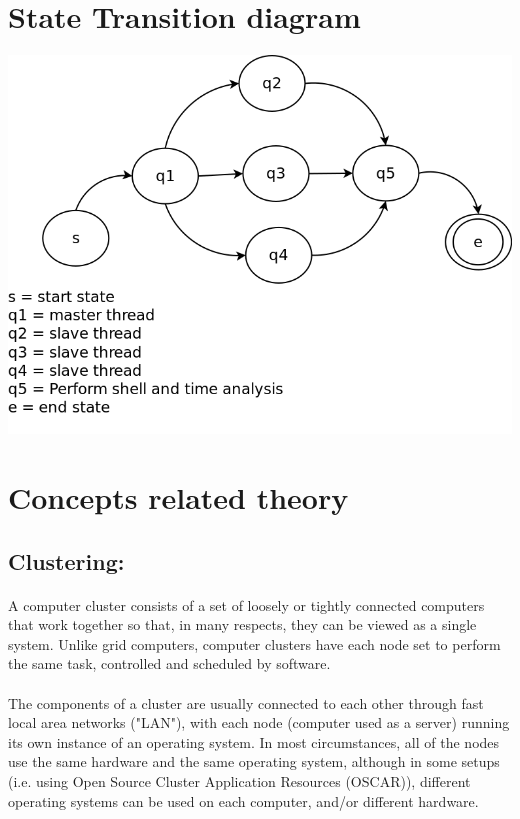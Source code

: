 \documentclass[10pt,a4paper]{article}
\begin{document}
\section{State Transition diagram}
\includegraphics[scale=0.30]{stdg.png}

\section{Concepts related theory}
\subsection{Clustering:} 
\paragraph{} A computer cluster consists of a set of loosely or tightly connected computers that work together so that, in many respects, they can be viewed as a single system. Unlike grid computers, computer clusters have each node set to perform the same task, controlled and scheduled by software. 

\paragraph{} The components of a cluster are usually connected to each other through fast local area networks ("LAN"), with each node (computer used as a server) running its own instance of an operating system. In most circumstances, all of the nodes use the same hardware and the same operating system, although in some setups (i.e. using Open Source Cluster Application Resources (OSCAR)), different operating systems can be used on each computer, and/or different hardware. \\
\end{document}
